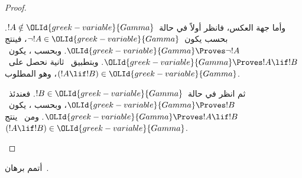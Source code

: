 \documentclass[../../../include/open-logic-section]{subfiles}
\begin{document}
\begin{proof}
\begin{enumerate}
{{وأما جهة العكس، فانظر أولاً في حالة~$!A \notin {\OLId{greek-variable}{Gamma}}$. بحسب
 يكون~$\lnot !A \in {\OLId{greek-variable}{Gamma}}$، فينتج
${\OLId{greek-variable}{Gamma}} \Proves \lnot !A$. وبحسب
،
يكون~${\OLId{greek-variable}{Gamma}} \Proves !A \lif !B$. وبتطبيق~
ثانية نحصل على~$(!A \lif !B) \in {\OLId{greek-variable}{Gamma}}$، وهو المطلوب.

ثم انظر في حالة~$!B \in {\OLId{greek-variable}{Gamma}}$. فعندئذ~${\OLId{greek-variable}{Gamma}} \Proves !B$، وبحسب
،
يكون~${\OLId{greek-variable}{Gamma}} \Proves !A \lif !B$. ومن~ ينتج
$(!A \lif !B) \in {\OLId{greek-variable}{Gamma}}$.}}
\end{enumerate}
\end{proof}

\begin{prob}
أتمم برهان~.
\end{prob}
\end{document}
